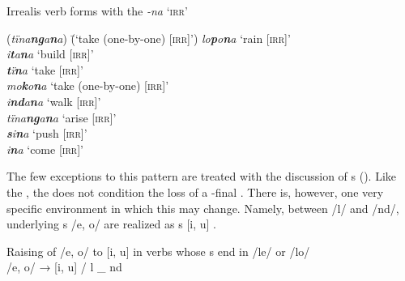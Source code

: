 \ea%
    \label{ex:verbs:5}
            Irrealis verb forms with the  \textit{-na} ‘\textsc{irr}’\\
\begin{tabbing}
{(\textit{tïna\textbf{ng}a\textbf{n}a})} \= {(‘take (one-by-one) [\textsc{irr}]’)}\kill
\textit{lo\textbf{p}o\textbf{n}a} \> {‘rain [\textsc{irr}]’}\\
\textit{i\textbf{t}a\textbf{n}a} \> {‘build [\textsc{irr}]’}\\
\textit{\textbf{t}ï\textbf{n}a} \> {‘take [\textsc{irr}]’}\\
\textit{mo\textbf{k}o\textbf{n}a} \> {‘take (one-by-one) [\textsc{irr}]’}\\
\textit{i\textbf{nd}a\textbf{n}a} \> {‘walk [\textsc{irr}]’}\\
\textit{tïna\textbf{ng}a\textbf{n}a} \> {‘arise [\textsc{irr}]’}\\
\textit{\textbf{s}i\textbf{n}a} \> {‘push [\textsc{irr}]’}\\
\textit{i\textbf{n}a} \> {‘come [\textsc{irr}]’}
    \end{tabbing}
\z

The few exceptions to this pattern are treated with the discussion of s (). Like the  , the   does not condition the loss of a -final . There is, however, one very specific environment in which this  may change. Namely, between /l/ and /nd/, underlying s /e, o/ are realized as s [i, u] .

\ea%
    \label{ex:verbs:6}
            Raising of /e, o/ to [i, u] in  verbs whose s end in /le/ or /lo/\\
    /e, o/ → [i, u] / l \_ nd
\z

